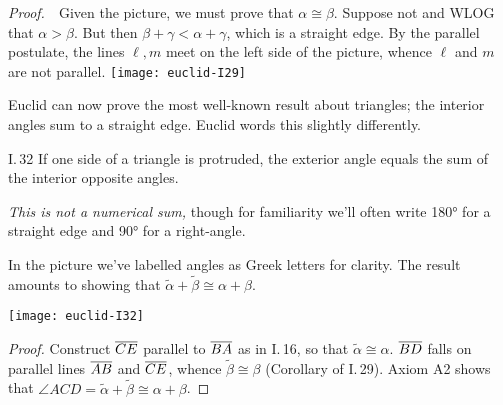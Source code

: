 \begin{tcolorbox}[proofstyle,lower separated=false, sidebyside, sidebyside align=top seam, sidebyside gap=0pt, righthand width=0.37\linewidth]
\emph{Proof.}\ \ Given the picture, we must prove that $\alpha\cong\beta$.\smallbreak
Suppose not and WLOG that $\alpha>\beta$.\smallbreak
But then $\beta+\gamma<\alpha+\gamma$, which is a straight edge.\smallbreak
By the parallel postulate, the lines $\ell,m$ meet on the left side of the picture, whence $\ell$ and $m$ are not parallel.
\tcblower
\flushright\texttt{[image: euclid-I29]}\\[-10pt]\qedsymbol
\end{tcolorbox}

Euclid can now prove the most well-known result about triangles; the interior angles sum to a straight edge. Euclid words this slightly differently.

\begin{thm}{I.\,32}{}
If one side of a triangle is protruded, the exterior angle equals the sum of the interior opposite angles.
\end{thm}

\begin{minipage}[t]{0.62\linewidth}\vspace{-4pt}
\emph{This is not a numerical sum,} though for familiarity we'll often write \ang{180} for a straight edge and \ang{90} for a right-angle.\par
In the picture we've labelled angles as Greek letters for clarity. The result amounts to showing that $\widetilde\alpha+\widetilde\beta\cong\alpha+\beta$.
\end{minipage}\hfill\begin{minipage}[t]{0.37\linewidth}\vspace{-9pt}
\flushright\texttt{[image: euclid-I32]}
\end{minipage}

\vspace{-20pt}

\begin{proof}
Construct $\overline{CE}$ parallel to $\overline{BA}$ as in I.\,16, so that $\widetilde\alpha\cong\alpha$.\smallbreak
$\overline{BD}$ falls on parallel lines $\overline{AB}$ and $\overline{CE}$, whence $\widetilde\beta\cong\beta$ (Corollary of I.\,29).\smallbreak
Axiom A2 shows that $\angle ACD=\widetilde\alpha+\widetilde\beta\cong\alpha+\beta$.
\end{proof}

\label{pg:sphere}


